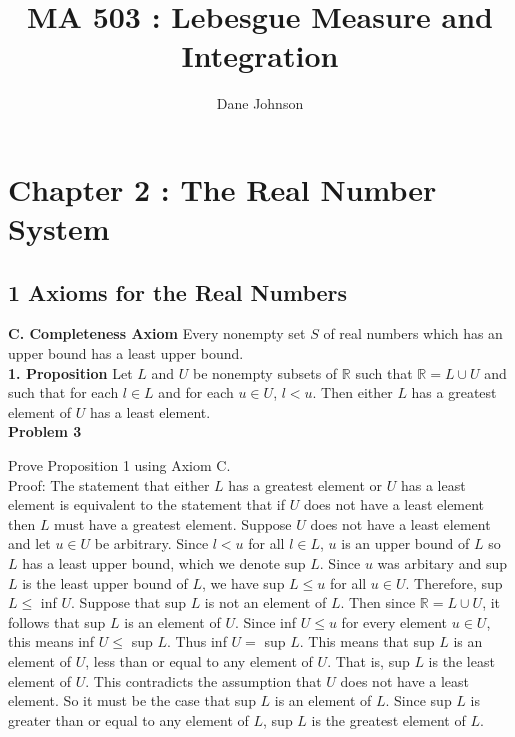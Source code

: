 \documentclass[a4paper]{article}
\title{MA 503 : Lebesgue Measure and Integration}
\author{Dane Johnson}
\begin{document}
\maketitle

\section*{Chapter 2 : The Real Number System}

\subsection*{1 Axioms for the Real Numbers}

{\bf C. Completeness Axiom} Every nonempty set $S$ of real numbers which has an upper bound has a least upper bound.\\


{\bf 1. Proposition} Let $L$ and $U$ be nonempty subsets of $\mathbb{R}$ such that $\mathbb{R} = L \cup U$ and such that for each $l \in L$ and for each $u \in U$, $l<u$. Then either $L$ has a greatest element of $U$ has a least element.\\

{\bf Problem 3}

Prove Proposition 1 using Axiom C.\\

Proof: The statement that either $L$ has a greatest element or $U$ has a least element is equivalent to the statement that if $U$ does not have a least element then $L$ must have a greatest element. Suppose $U$ does not have a least element and let $u \in U$ be arbitrary. Since $l<u$ for all $l \in L$, $u$ is an upper bound of $L$ so $L$ has a least upper bound, which we denote sup $L$. Since $u$ was arbitary and sup $L$ is the least upper bound of $L$, we have sup $L \leq u$ for all $u \in U$. Therefore, sup $L \leq $ inf $U$. Suppose that sup $L$ is not an element of $L$. Then since $\mathbb{R} = L \cup U$, it follows that sup $L$ is an element of $U$. Since inf $U \leq u$ for every element $u \in U$, this means inf $U \leq $ sup $L$. Thus inf $U = $ sup $L$. This means that sup $L$ is an element of $U$, less than or equal to any element of $U$. That is, sup $L$ is the least element of $U$. This contradicts the assumption that $U$ does not have a least element. So it must be the case that sup $L$ is an element of $L$. Since sup $L$ is greater than or equal to any element of $L$, sup $L$ is the greatest element of $L$. \\
\end{document}
